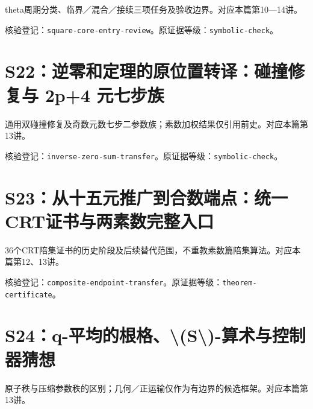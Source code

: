 \documentclass[11pt,a4paper,oneside,openany]{book}
\theoremstyle{definition}\newtheorem{example}[theorem]{例}\newtheorem{conjecture}[theorem]{猜想}
\numberwithin{equation}{chapter}\setcounter{tocdepth}{1}
\begin{document}
theta周期分类、临界／混合／接续三项任务及验收边界。对应本篇第10—14讲。

\par{}\par

核验登记：{\small\nolinkurl{square-core-entry-review}}。原证据等级：{\small\nolinkurl{symbolic-check}}。

\section{S22：逆零和定理的原位置转译：碰撞修复与 2p+4 元七步族}\label{source:S22}

通用双碰撞修复及奇数元数七步二参数族；素数加权结果仅引用前史。对应本篇第13讲。

\par{}\par

核验登记：{\small\nolinkurl{inverse-zero-sum-transfer}}。原证据等级：{\small\nolinkurl{symbolic-check}}。

\section{S23：从十五元推广到合数端点：统一CRT证书与两素数完整入口}\label{source:S23}

36个CRT陪集证书的历史阶段及后续替代范围，不重教素数篇陪集算法。对应本篇第12、13讲。

\par{}\par

核验登记：{\small\nolinkurl{composite-endpoint-transfer}}。原证据等级：{\small\nolinkurl{theorem-certificate}}。

\section{S24：q-平均的根格、\textbackslash{}(S\textbackslash{})-算术与控制器猜想}\label{source:S24}

原子秩与压缩参数秩的区别；几何／正运输仅作为有边界的候选框架。对应本篇第13讲。

\par{}\par
\end{document}
